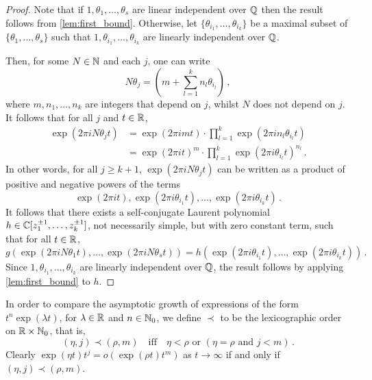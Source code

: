 \begin{proof}
Note that if $1, \theta_{1}, \ldots, \theta_{s}$ are linear independent over $\mathbb{Q}$ then the result follows from \cref{lem:first_bound}.
Otherwise, let $\lbrace \theta_{i_{1}}, \ldots, \theta_{i_{k}} \rbrace$ be a maximal subset of $\lbrace \theta_{1}, \ldots, \theta_{s} \rbrace$ such that $1, \theta_{i_{1}}, \ldots, \theta_{i_{k}}$ are linearly independent over $\mathbb{Q}$.

Then, for some $N\in\mathbb{N}$ and each $j$, one can write
\begin{equation*}
N\theta_{j}= \left( m  +\sum\limits_{l=1}^{k} n_{l}\theta_{i_{l}} \right) \, ,
\end{equation*}
where $m,n_{1},\ldots,n_{k}$ are integers that depend on $j$, whilst $N$ does not depend on $j$. It follows that for all $j$ and $t \in \mathbb{R}$,
\begin{align*}
\exp(2 \pi i N\theta_{j} t) &= \exp( 2 \pi i m t) \cdot \prod\limits_{l=1}^{k} \exp(2 \pi i  n_{l} \theta_{i_{l}} t) \\
&= \exp(2 \pi i t)^{m} \cdot \prod\limits_{l=1}^{k} \exp(2 \pi i \theta_{i_{l}} t)^{n_{l}}  \, .
\end{align*}
In other words, for all $j \geq k+1$, $\exp(2 \pi i N \theta_{j} t)$ can be written as a product of positive and negative powers of the terms
\begin{equation*}
  \exp(2 \pi i t), \exp(2 \pi i \theta_{i_{1}} t), \ldots, \exp(2 \pi i \theta_{i_{k}} t) \, .
\end{equation*}
It follows that there exists a self-conjugate Laurent polynomial
$h\in\mathbb{C} [z_1^{\pm 1},\ldots,z_k^{\pm 1}]$, not necessarily
simple, but with zero constant term, such that for all
$t\in \mathbb{R}$,
\[ g(\exp(2 \pi i N \theta_{1} t), \ldots, \exp(2 \pi i N \theta_{s} t)) =
  h(\exp(2 \pi i \theta_{i_{1}} t),\ldots,\exp(2 \pi i \theta_{i_{k}} t)) \, .\]
Since $1, \theta_{i_{1}}, \ldots, \theta_{i_{k}}$ are linearly independent over $\mathbb{Q}$, the result follows by applying \cref{lem:first_bound}
to $h$.
\end{proof}

In order to compare the asymptotic growth of expressions of the form
$t^{n}\exp(\lambda t)$, for $\lambda\in\mathbb{R}$ and
$n\in\mathbb{N}_0$, we define $\prec$ to be the lexicographic order on
$\mathbb{R}\times\mathbb{N}_{0}$, that is,
\begin{equation*}
(\eta,j)\prec (\rho,m) \quad \mbox{iff} \quad
\eta<\rho \mbox{ or } (\eta = \rho \mbox{ and } j< m) \, .
\end{equation*}
Clearly $\exp(\eta t)t^{j}=o(\exp(\rho t)t^{m})$ as $t\rightarrow \infty$ if and only if $(\eta,j)\prec (\rho,m)$.

